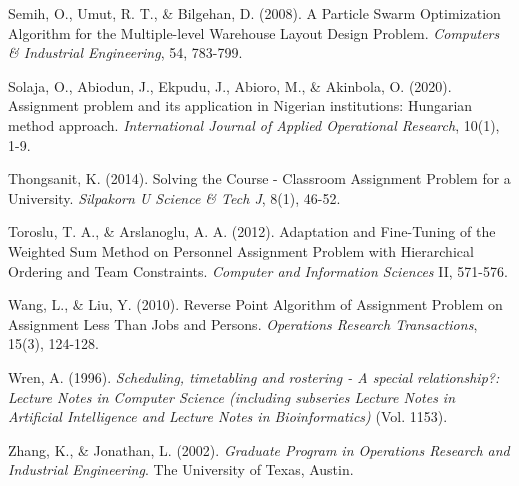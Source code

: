 \documentclass[11pt]{report}
\begin{document}
\begin{description}
		\item Semih, O., Umut, R. T., \& Bilgehan, D. (2008). A Particle Swarm Optimization Algorithm for the
		Multiple-level Warehouse Layout Design Problem. \emph{Computers \& Industrial Engineering},
		54, 783-799.
		
		\item Solaja, O., Abiodun, J., Ekpudu, J., Abioro, M., \& Akinbola, O. (2020). Assignment problem and
		its application in Nigerian institutions: Hungarian method approach. \emph{International Journal
		of Applied Operational Research}, 10(1), 1-9.
		
		\item Thongsanit, K. (2014). Solving the Course - Classroom Assignment Problem for a University.
		\emph{Silpakorn U Science \& Tech J}, 8(1), 46-52.
		
		\item Toroslu, T. A., \& Arslanoglu, A. A. (2012). Adaptation and Fine-Tuning of the Weighted Sum
		Method on Personnel Assignment Problem with Hierarchical Ordering and Team Constraints. \emph{Computer and Information Sciences} II, 571-576.
		
		\item Wang, L., \& Liu, Y. (2010). Reverse Point Algorithm of Assignment Problem on Assignment Less Than Jobs and Persons. \emph{Operations Research Transactions}, 15(3), 124-128.
		
		\item Wren, A. (1996). \emph{Scheduling, timetabling and rostering - A special relationship?: Lecture Notes
		in Computer Science (including subseries Lecture Notes in Artificial Intelligence and
		Lecture Notes in Bioinformatics)} (Vol. 1153).
		
		\item Zhang, K., \& Jonathan, L. (2002). \emph{Graduate Program in Operations Research and Industrial Engineering}. The University of Texas, Austin.
	\end{description}
	
\end{document}
